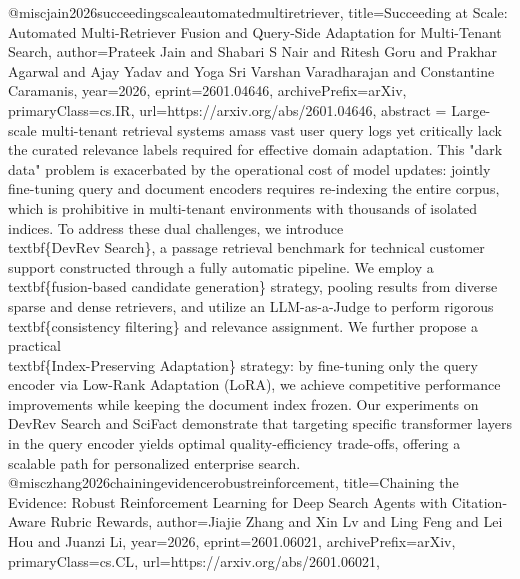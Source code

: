 {}@misc{jain2026succeedingscaleautomatedmultiretriever,
      title={Succeeding at Scale: Automated Multi-Retriever Fusion and Query-Side Adaptation for Multi-Tenant Search}, 
      author={Prateek Jain and Shabari S Nair and Ritesh Goru and Prakhar Agarwal and Ajay Yadav and Yoga Sri Varshan Varadharajan and Constantine Caramanis},
      year={2026},
      eprint={2601.04646},
      archivePrefix={arXiv},
      primaryClass={cs.IR},
      url={https://arxiv.org/abs/2601.04646},
      abstract = {Large-scale multi-tenant retrieval systems amass vast user query logs yet critically lack the curated relevance labels required for effective domain adaptation. This "dark data" problem is exacerbated by the operational cost of model updates: jointly fine-tuning query and document encoders requires re-indexing the entire corpus, which is prohibitive in multi-tenant environments with thousands of isolated indices. To address these dual challenges, we introduce \\textbf\{DevRev Search\}, a passage retrieval benchmark for technical customer support constructed through a fully automatic pipeline. We employ a \\textbf\{fusion-based candidate generation\} strategy, pooling results from diverse sparse and dense retrievers, and utilize an LLM-as-a-Judge to perform rigorous \\textbf\{consistency filtering\} and relevance assignment. We further propose a practical \\textbf\{Index-Preserving Adaptation\} strategy: by fine-tuning only the query encoder via Low-Rank Adaptation (LoRA), we achieve competitive performance improvements while keeping the document index frozen. Our experiments on DevRev Search and SciFact demonstrate that targeting specific transformer layers in the query encoder yields optimal quality-efficiency trade-offs, offering a scalable path for personalized enterprise search.}
}@misc{zhang2026chainingevidencerobustreinforcement,
      title={Chaining the Evidence: Robust Reinforcement Learning for Deep Search Agents with Citation-Aware Rubric Rewards}, 
      author={Jiajie Zhang and Xin Lv and Ling Feng and Lei Hou and Juanzi Li},
      year={2026},
      eprint={2601.06021},
      archivePrefix={arXiv},
      primaryClass={cs.CL},
      url={https://arxiv.org/abs/2601.06021},
}
